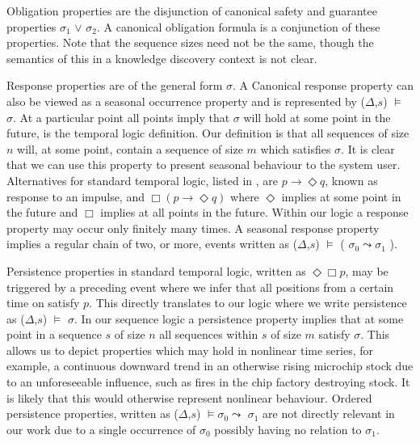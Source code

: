 \medskip

Obligation properties are the disjunction of canonical safety
and guarantee properties  $\sigma_1$ $\vee$ 
$\sigma_2$. A canonical
obligation formula is a conjunction of these properties. Note that the
sequence sizes need not be the same, though the semantics of this in a
knowledge discovery context is not clear.

\smallskip
{}
Response properties are of the general form  $\sigma$. A
Canonical response property can also be viewed as a seasonal 
occurrence property and is represented by 
($\Delta$,$s$) $\models$  $\sigma$. At a particular 
point all points imply that $\sigma$ will hold at some point  in the
future, is the temporal logic definition. Our definition is that 
all sequences of size $n$ will, at some point, contain a sequence of
size $m$ which satisfies $\sigma$. It is clear that we can use this
property to present seasonal behaviour to the system user.
Alternatives for standard temporal logic, listed in \cite{mp92}, are
$p \to \Diamond q$, 
known as response to an impulse, and
$\Box(p \to \Diamond q)$ where $\Diamond$ implies at some point in the
future and $\Box$ implies at all points in the future.
Within our logic a response property may occur only finitely
many times. A seasonal response property implies a regular chain of
two, or more, events written as
($\Delta$,$s$) $\models$  ( $\sigma_0 \leadsto \sigma_1$ ).

\medskip
{}

Persistence properties in standard temporal logic, written as
$\Diamond\Box p$, may be triggered by a preceding
event where we infer that all positions from a certain time on
satisfy $p$. This directly translates to our logic where we
write persistence as
($\Delta$,$s$) $\models$ 
 $\sigma$. In our sequence logic a
persistence property implies that at some point in a sequence $s$ of size
$n$ all sequences within $s$ of size $m$ satisfy $\sigma$. This allows
us to depict properties which may hold in nonlinear time
series, for example, a continuous downward trend in an otherwise
rising microchip stock
due to an unforeseeable influence, such as fires in the chip factory
destroying stock. It is likely that this would otherwise represent
nonlinear behaviour. Ordered persistence properties, written as 
($\Delta$,$s$) $\models \sigma_0 \leadsto$  $\sigma_1$ are
not directly relevant in our work due to a single occurrence of
$\sigma_0$ possibly having no relation to  $\sigma_1$.

